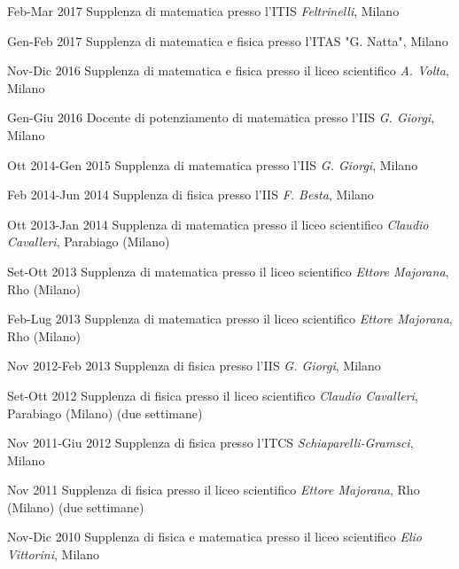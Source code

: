 \begin{CV}	
	\item[Feb-Mar 2017] Supplenza di matematica presso l'ITIS {\em Feltrinelli}, Milano
	
	\item[Gen-Feb 2017] Supplenza di matematica e fisica presso l'ITAS "G. Natta", Milano
	
	\item[Nov-Dic 2016] Supplenza di matematica e fisica presso il liceo scientifico {\em A. Volta}, Milano
	
	\item[Gen-Giu 2016] Docente di potenziamento di matematica presso l'IIS {\em G. Giorgi}, Milano
	
	\item[Ott 2014-Gen 2015] Supplenza di matematica presso l'IIS {\em G. Giorgi}, Milano
	
	\item[Feb 2014-Jun 2014] Supplenza di fisica presso l'IIS {\em F. Besta}, Milano
	
	\item[Ott 2013-Jan 2014] Supplenza di matematica presso il liceo scientifico {\em Claudio Cavalleri}, Parabiago (Milano)
	
	\item[Set-Ott 2013] Supplenza di matematica presso il liceo scientifico {\em Ettore Majorana}, Rho (Milano)
	
	\item[Feb-Lug 2013] Supplenza di matematica presso il liceo scientifico {\em Ettore Majorana}, Rho (Milano)
	
	\item[Nov 2012-Feb 2013] Supplenza di fisica presso l'IIS {\em G. Giorgi}, Milano
	
	\item[Set-Ott 2012] Supplenza di fisica presso il liceo scientifico {\em Claudio Cavalleri}, Parabiago (Milano) (due settimane)
	
	\item[Nov 2011-Giu 2012] Supplenza di fisica presso l'ITCS {\em Schiaparelli-Gramsci}, Milano
	
	\item[Nov 2011] Supplenza di fisica presso il liceo scientifico {\em Ettore Majorana}, Rho (Milano) (due settimane)
	
	\item[Nov-Dic 2010] Supplenza di fisica e matematica presso il liceo scientifico {\em Elio Vittorini}, Milano
	

\end{CV}

